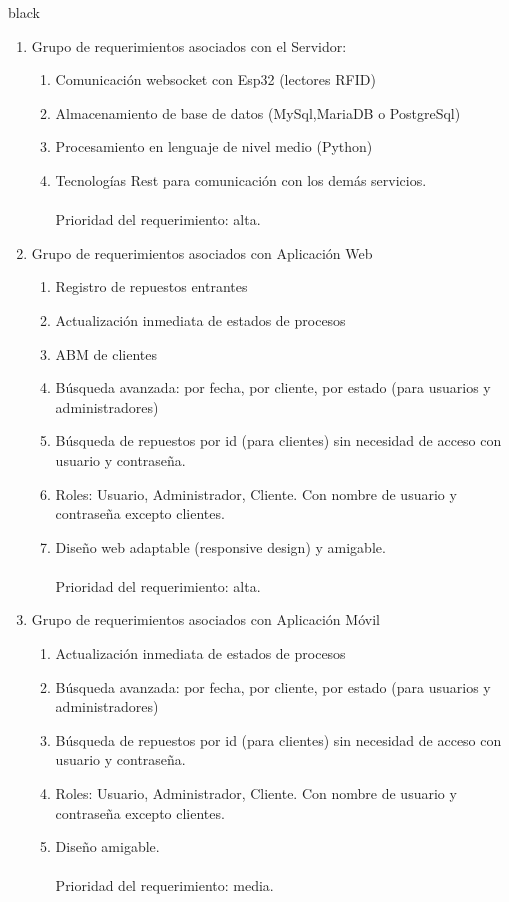 \documentclass[11pt]{charter}
\begin{document}
\begin{consigna}{black}

\begin{enumerate}
\item Grupo de requerimientos asociados con el Servidor:
	\begin{enumerate}
	\item Comunicación websocket con Esp32 (lectores RFID)
	\item Almacenamiento de base de datos (MySql,MariaDB o PostgreSql)
	\item Procesamiento en lenguaje de nivel medio (Python)
	\item Tecnologías Rest para comunicación con los demás servicios.
	\\\\ Prioridad del requerimiento: alta.
	\end{enumerate}
\item Grupo de requerimientos asociados con Aplicación Web
	\begin{enumerate}
	\item Registro de repuestos entrantes
	\item Actualización inmediata de estados de procesos
	\item ABM de clientes
	\item Búsqueda avanzada: por fecha, por cliente, por estado (para usuarios y administradores)
	\item Búsqueda de repuestos por id (para clientes) sin necesidad de acceso con usuario y contraseña.
	\item Roles: Usuario, Administrador, Cliente. Con nombre de usuario y contraseña excepto clientes.
	\item Diseño web adaptable (responsive design) y amigable.
	\\\\ Prioridad del requerimiento: alta.
	\end{enumerate}
\item Grupo de requerimientos asociados con Aplicación Móvil
	\begin{enumerate}
	\item Actualización inmediata de estados de procesos
	\item Búsqueda avanzada: por fecha, por cliente, por estado (para usuarios y administradores)
	\item Búsqueda de repuestos por id (para clientes) sin necesidad de acceso con usuario y contraseña.
	\item Roles: Usuario, Administrador, Cliente. Con nombre de usuario y contraseña excepto clientes.
	\item Diseño amigable.
	\\\\ Prioridad del requerimiento: media.
	\end{enumerate}
\end{enumerate}


\end{consigna}
\end{document}
